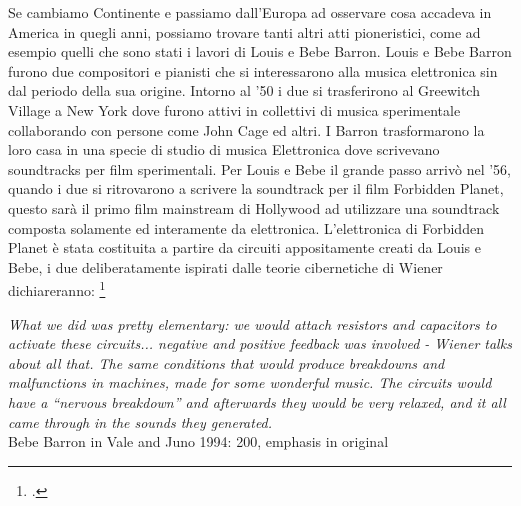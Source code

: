 Se cambiamo Continente e passiamo dall'Europa ad osservare cosa accadeva
in America in quegli anni, possiamo trovare tanti altri atti pioneristici,
come ad esempio quelli che sono stati i lavori di Louis e Bebe Barron.
Louis e Bebe Barron furono due compositori e pianisti che si
interessarono alla musica elettronica sin dal periodo della sua origine.
Intorno al '50 i due si trasferirono al Greewitch Village a New York
dove furono attivi in collettivi di musica sperimentale
collaborando con persone come John Cage ed altri.
I Barron trasformarono
la loro casa in una specie di studio di musica Elettronica
dove scrivevano soundtracks per film sperimentali.
Per Louis e Bebe il grande passo arrivò nel
'56, quando i due si ritrovarono a scrivere la soundtrack per il film
Forbidden Planet,
questo sarà il primo film mainstream di Hollywood ad utilizzare una soundtrack
composta solamente ed interamente da elettronica.
L'elettronica di Forbidden Planet è stata
costituita a partire da circuiti appositamente creati da Louis e Bebe,
i due deliberatamente ispirati dalle teorie cibernetiche di Wiener
dichiareranno: \footcite{dunbarlisteningcyb}

\begin{center}
\vspace{0.5cm}
\textit{What we did was pretty elementary: we would attach resistors and capacitors
to activate these
circuits... negative and positive feedback was involved - Wiener
talks about all that. The same
conditions that would produce breakdowns and malfunctions in machines,
made for some
wonderful music. The circuits would have a “nervous breakdown”
and afterwards they would be
very relaxed, and it all came through in the sounds they generated.} \\
\vspace{0.5cm}
Bebe Barron in Vale and Juno 1994: 200, emphasis in original
\vspace{0.5cm}
\end{center}

